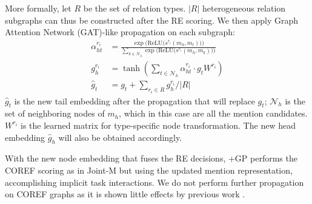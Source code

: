 \documentclass[11pt]{article}
\begin{document}
More formally, let $R$ be the set of relation types. $|R|$ heterogeneous relation subgraphs can thus be constructed after the RE scoring. We then apply Graph Attention Network (GAT)-like propagation \citep{gat} on each subgraph:
\begin{align}
    \alpha^{r_i}_{ht} &= \frac{\exp \big( \text{ReLU} \big( s^{r_i}(m_h, m_t)\big)\big)}{\sum_{k \in \mathcal{N}_h} \exp \big( \text{ReLU} \big(s^{r_i}(m_h, m_k)\big)\big)} \\
    g^{r_i}_h &= \tanh (\sum_{t \in \mathcal{N}_h} \alpha^{r_i}_{ht} \cdot g_t W^{r_i}) \\
    \hat{g}_t &= g_t + \sum_{r_i \in R} g^{r_i}_h / |R|
\end{align}
$\hat{g}_t$ is the new tail embedding after the propagation that will replace $g_t$; $\mathcal{N}_h$ is the set of neighboring nodes of $m_h$, which in this case are all the mention candidates. $W^{r_i}$ is the learned matrix for type-specific node transformation. The new head embedding $\hat{g}_h$ will also be obtained accordingly.

With the new node embedding that fuses the RE decisions, +GP performs the COREF scoring as in Joint-M but using the updated mention representation, accomplishing implicit task interactions.
We do not perform further propagation on COREF graphs as it is shown little effects by previous work \citep{dygie++,xu-choi-2020-revealing}.
\end{document}
